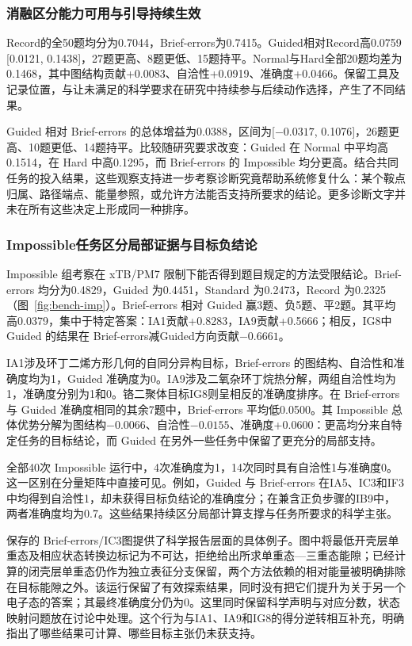 \subsubsection{消融区分能力可用与引导持续生效}

Record的全50题均分为0.7044，Brief-errors为0.7415。Guided相对Record高0.0759 [0.0121, 0.1438]，27题更高、8题更低、15题持平。Normal与Hard全部20题均差为0.1468，其中图结构贡献+0.0083、自洽性+0.0919、准确度+0.0466。保留工具及记录位置，与让未满足的科学要求在研究中持续参与后续动作选择，产生了不同结果。

Guided 相对 Brief-errors 的总体增益为0.0388，区间为[$-0.0317$, 0.1076]，26题更高、10题更低、14题持平。比较随研究要求改变：Guided 在 Normal 中平均高0.1514，在 Hard 中高0.1295，而 Brief-errors 的 Impossible 均分更高。结合共同任务的投入结果，这些观察支持进一步考察诊断究竟帮助系统修复什么：某个鞍点归属、路径端点、能量参照，或允许方法能否支持所要求的结论。更多诊断文字并未在所有这些决定上形成同一种排序。

\subsubsection{Impossible任务区分局部证据与目标负结论}

Impossible 组考察在 xTB/PM7 限制下能否得到题目规定的方法受限结论。Brief-errors 均分为0.4829，Guided 为0.4451，Standard 为0.2473，Record 为0.2325（图~\ref{fig:bench-imp}）。Brief-errors 相对 Guided 赢3题、负5题、平2题。其平均高0.0379，集中于特定答案：IA1贡献+0.8283，IA9贡献+0.5666；相反，IG8中 Guided 的结果在 Brief-errors减Guided方向贡献$-0.6661$。

IA1涉及环丁二烯方形几何的自同分异构目标，Brief-errors 的图结构、自洽性和准确度均为1，Guided 准确度为0。IA9涉及二氧杂环丁烷热分解，两组自洽性均为1，准确度分别为1和0。铬二聚体目标IG8则呈相反的准确度排序。在 Brief-errors 与 Guided 准确度相同的其余7题中，Brief-errors 平均低0.0500。其 Impossible 总体优势分解为图结构$-0.0066$、自洽性$-0.0155$、准确度+0.0600：更高均分来自特定任务的目标结论，而 Guided 在另外一些任务中保留了更充分的局部支持。

全部40次 Impossible 运行中，4次准确度为1，14次同时具有自洽性1与准确度0。这一区别在分量矩阵中直接可见。例如，Guided 与 Brief-errors 在IA5、IC3和IF3中均得到自洽性1，却未获得目标负结论的准确度分；在兼含正负步骤的IB9中，两者准确度均为0.7。这些结果持续区分局部计算支撑与任务所要求的科学主张。

保存的 Brief-errors/IC3图提供了科学报告层面的具体例子。图中将最低开壳层单重态及相应状态转换边标记为不可达，拒绝给出所求单重态—三重态能隙；已经计算的闭壳层单重态仍作为独立表征分支保留，两个方法依赖的相对能量被明确排除在目标能隙之外。该运行保留了有效探索结果，同时没有把它们提升为关于另一个电子态的答案；其最终准确度分仍为0。这里同时保留科学声明与对应分数，状态映射问题放在讨论中处理。这个行为与IA1、IA9和IG8的得分逆转相互补充，明确指出了哪些结果可计算、哪些目标主张仍未获支持。

